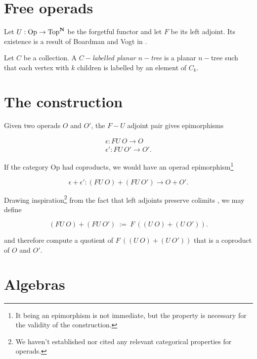 \documentclass{amsart}
\begin{document}
\section{Free operads}

Let $U : \mathrm{Op} \to \mathrm{Top}^{\mathbf{N}}$ be the forgetful functor and
let $F$ be its left adjoint. Its existence is a result of Boardman and Vogt
in \cite{bv-hiasots}.

\begin{defn}
	Let $C$ be a collection. A \emph{$C-$labelled planar $n-$tree} is a
	planar $n-$tree such that each vertex with $k$ children is labelled
	by an element of $C_k$.
\end{defn}


	

\section{The construction}

Given two operads $O$ and $O'$, the $F-U$ adjoint pair gives epimorphisms 

\begin{eqnarray}\label{fu-epis}
	\epsilon : FU \ O \to O \\
	\epsilon' : FU \ O' \to O'.
\end{eqnarray}

If the category $\mathrm{Op}$ had coproducts, we would have an operad
epimorphism\footnote{It being an epimorphism is not immediate, but the
property is necessary for the validity of the construction.}

\begin{equation}\label{cpd-epis}
	\epsilon + \epsilon' : (FU \ O) + (FU \ O') \to O + O'.
\end{equation}

Drawing inspiration\footnote{We haven't established nor cited any relevant
categorical properties for operads.} from the fact that left adjoints
preserve colimits \cite{riehl-ctic}, we may define


\begin{equation}\label{fu-coprod}
	(FU \ O) + (FU \ O') \ := \ F \ \left( (U \ O) + (U \ O')
	\right).
\end{equation}

and therefore compute a quotient of $F \ \left( (U \ O) + (U \ O')
\right)$ that is a coproduct of $O$ and $O'$.

\section{Algebras}
\end{document}
